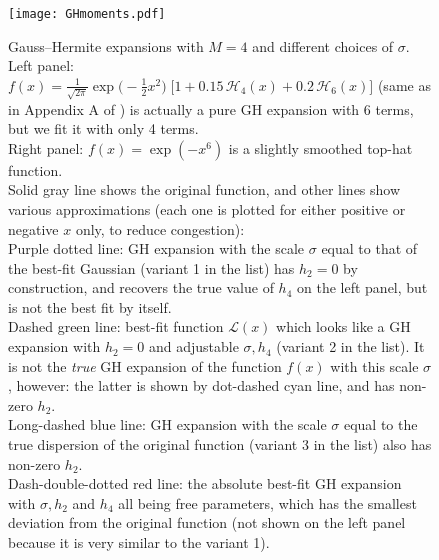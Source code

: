 \documentclass[12pt]{article}
\begin{document}
\begin{figure}
\begin{center}
\texttt{[image: GHmoments.pdf]}
\end{center}
\caption{Gauss--Hermite expansions with $M=4$ and different choices of $\sigma$. \protect\\
Left panel: $f(x) = \frac{1}{\sqrt{2\pi}} \exp\big(-\frac{1}{2} x^2 \big) \;\big[1 + 0.15\, \mathcal H_4(x) + 0.2\, \mathcal H_6(x) \big]$ (same as in Appendix A of \cite{Joseph2001}) is actually a pure GH expansion with 6 terms, but we fit it with only 4 terms. \protect\\
Right panel: $f(x) = \exp(-x^6)$ is a slightly smoothed top-hat function. \protect\\
Solid gray line shows the original function, and other lines show various approximations (each one is plotted for either positive or negative $x$ only, to reduce congestion): \protect\\
Purple dotted line: GH expansion with the scale $\sigma$ equal to that of the best-fit Gaussian (variant 1 in the list) has $h_2=0$ by construction, and recovers the true value of $h_4$ on the left panel, but is not the best fit by itself.\protect\\
Dashed green line: best-fit function $\mathscr L(x)$ which looks like a GH expansion with $h_2=0$ and adjustable $\sigma,h_4$ (variant 2 in the list). It is not the \textit{true} GH expansion of the function $f(x)$ with this scale $\sigma$, however: the latter is shown by dot-dashed cyan line, and has non-zero $h_2$.\protect\\
Long-dashed blue line: GH expansion with the scale $\sigma$ equal to the true dispersion of the original function (variant 3 in the list) also has non-zero $h_2$.\protect\\
Dash-double-dotted red line: the absolute best-fit GH expansion with $\sigma, h_2$ and $h_4$ all being free parameters, which has the smallest deviation from the original function (not shown on the left panel because it is very similar to the variant 1).
} \label{fig:GHmoments}
\end{figure}
\end{document}
